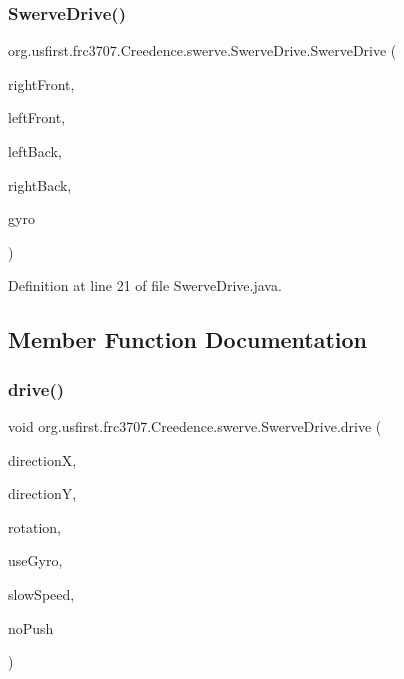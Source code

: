 \subsubsection{\texorpdfstring{SwerveDrive()}{SwerveDrive()}}
{\footnotesize\ttfamily org.\+usfirst.\+frc3707.\+Creedence.\+swerve.\+Swerve\+Drive.\+Swerve\+Drive (\begin{DoxyParamCaption}\item[{\mbox{\hyperlink{classorg_1_1usfirst_1_1frc3707_1_1_creedence_1_1swerve_1_1_swerve_wheel}{Swerve\+Wheel}}}]{right\+Front,  }\item[{\mbox{\hyperlink{classorg_1_1usfirst_1_1frc3707_1_1_creedence_1_1swerve_1_1_swerve_wheel}{Swerve\+Wheel}}}]{left\+Front,  }\item[{\mbox{\hyperlink{classorg_1_1usfirst_1_1frc3707_1_1_creedence_1_1swerve_1_1_swerve_wheel}{Swerve\+Wheel}}}]{left\+Back,  }\item[{\mbox{\hyperlink{classorg_1_1usfirst_1_1frc3707_1_1_creedence_1_1swerve_1_1_swerve_wheel}{Swerve\+Wheel}}}]{right\+Back,  }\item[{Gyro\+Base}]{gyro }\end{DoxyParamCaption})}



Definition at line 21 of file Swerve\+Drive.\+java.



\subsection{Member Function Documentation}
\mbox{\label{classorg_1_1usfirst_1_1frc3707_1_1_creedence_1_1swerve_1_1_swerve_drive_a7cc64894af097683d35c98c26dd7b002}} 
\subsubsection{\texorpdfstring{drive()}{drive()}}
{\footnotesize\ttfamily void org.\+usfirst.\+frc3707.\+Creedence.\+swerve.\+Swerve\+Drive.\+drive (\begin{DoxyParamCaption}\item[{double}]{directionX,  }\item[{double}]{directionY,  }\item[{double}]{rotation,  }\item[{boolean}]{use\+Gyro,  }\item[{boolean}]{slow\+Speed,  }\item[{boolean}]{no\+Push }\end{DoxyParamCaption})}

